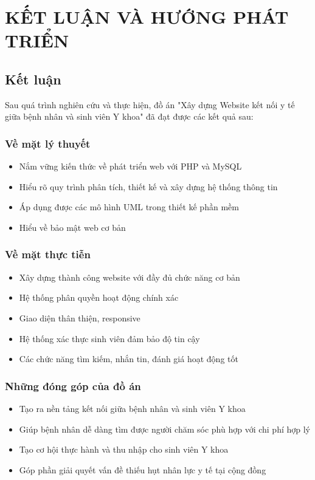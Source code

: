 \documentclass[a4paper,12pt]{report}
\begin{document}
\chapter{KẾT LUẬN VÀ HƯỚNG PHÁT TRIỂN}

\section{Kết luận}

Sau quá trình nghiên cứu và thực hiện, đồ án "Xây dựng Website kết nối y tế giữa bệnh nhân và sinh viên Y khoa" đã đạt được các kết quả sau:

\subsection{Về mặt lý thuyết}
\begin{itemize}
    \item Nắm vững kiến thức về phát triển web với PHP và MySQL
    \item Hiểu rõ quy trình phân tích, thiết kế và xây dựng hệ thống thông tin
    \item Áp dụng được các mô hình UML trong thiết kế phần mềm
    \item Hiểu về bảo mật web cơ bản
\end{itemize}

\subsection{Về mặt thực tiễn}
\begin{itemize}
    \item Xây dựng thành công website với đầy đủ chức năng cơ bản
    \item Hệ thống phân quyền hoạt động chính xác
    \item Giao diện thân thiện, responsive
    \item Hệ thống xác thực sinh viên đảm bảo độ tin cậy
    \item Các chức năng tìm kiếm, nhắn tin, đánh giá hoạt động tốt
\end{itemize}

\subsection{Những đóng góp của đồ án}
\begin{itemize}
    \item Tạo ra nền tảng kết nối giữa bệnh nhân và sinh viên Y khoa
    \item Giúp bệnh nhân dễ dàng tìm được người chăm sóc phù hợp với chi phí hợp lý
    \item Tạo cơ hội thực hành và thu nhập cho sinh viên Y khoa
    \item Góp phần giải quyết vấn đề thiếu hụt nhân lực y tế tại cộng đồng
\end{itemize}
\end{document}
